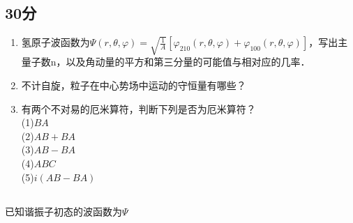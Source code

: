 
\subsection{30分}
\begin{enumerate}
\item 氢原子波函数为$\varPsi (r,\theta,\varphi)=\sqrt{\frac{1}{A}}[\varphi_{210}(r,\theta,\varphi)+\varphi_{100}(r,\theta,\varphi)]$，写出主量子数n，以及角动量的平方和第三分量的可能值与相对应的几率．
\item 不计自旋，粒子在中心势场中运动的守恒量有哪些？
\item 有两个不对易的厄米算符，判断下列是否为厄米算符？\\
(1)$BA$\\(2)$AB+BA$\\(3)$AB-BA$\\(4)$ABC$\\(5)$i(AB-BA)$
\end{enumerate}
\subsection{ }
已知谐振子初态的波函数为$\varPsi$